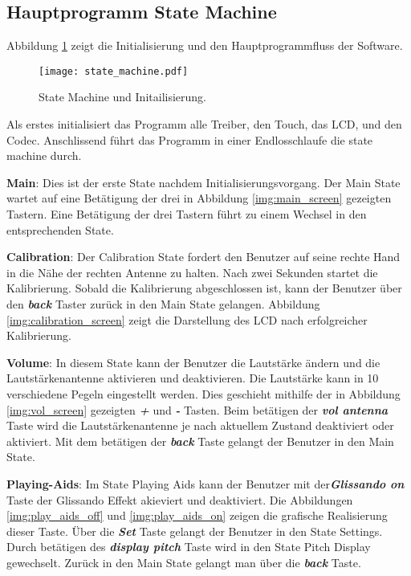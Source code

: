 \subsection{Hauptprogramm State Machine}\label{subsec:State_Machine}
Abbildung \ref{img:state_machine} zeigt die Initialisierung und den Hauptprogrammfluss der Software.
\begin{figure}[h]
	\centering
	\texttt{[image: state\_machine.pdf]}
	\caption{State Machine und Initailisierung.}
	\label{img:state_machine}
\end{figure}

Als erstes initialisiert das Programm alle Treiber, den Touch, das LCD, und den Codec. Anschlissend führt das Programm in einer Endlosschlaufe die state machine durch.

\textbf{Main}:
Dies ist der erste State nachdem Initialisierungsvorgang. Der Main State wartet auf eine Betätigung der drei in Abbildung \ref{img:main_screen} gezeigten Tastern. Eine Betätigung der drei Tastern führt zu einem Wechsel in den entsprechenden State. 
 
\textbf{Calibration}:
Der Calibration State fordert den Benutzer auf seine rechte Hand in die Nähe der rechten Antenne zu halten.
Nach zwei Sekunden startet die Kalibrierung. Sobald die Kalibrierung abgeschlossen ist, kann der Benutzer über den \textbf{\textit{back}} Taster zurück in den Main State gelangen. Abbildung \ref{img:calibration_screen} zeigt die Darstellung des LCD nach erfolgreicher Kalibrierung.

\textbf{Volume}:
In diesem State kann der Benutzer die Lautstärke ändern und die Lautstärkenantenne aktivieren und deaktivieren. Die Lautstärke kann in 10 verschiedene Pegeln eingestellt werden. Dies geschieht mithilfe der in Abbildung \ref{img:vol_screen} gezeigten \textbf{\textit{+}} und \textbf{\textit{-}} Tasten. Beim betätigen der \textbf{\textit{vol antenna}} Taste wird die Lautstärkenantenne je nach aktuellem Zustand deaktiviert oder aktiviert. Mit dem betätigen der \textbf{\textit{back}} Taste gelangt der Benutzer in den Main State.
 
\textbf{Playing-Aids}:
Im State Playing Aids kann der Benutzer mit der\textbf{\textit{Glissando on}} Taste der Glissando Effekt akieviert und deaktiviert. Die Abbildungen \ref{img:play_aids_off} und \ref{img:play_aids_on} zeigen die grafische Realisierung dieser Taste. Über die \textbf{\textit{Set}} Taste gelangt der Benutzer in den State Settings. Durch betätigen des \textbf{\textit{display pitch}} Taste wird in den State Pitch Display gewechselt. Zurück in den Main State gelangt man über die \textbf{\textit{back}} Taste.

